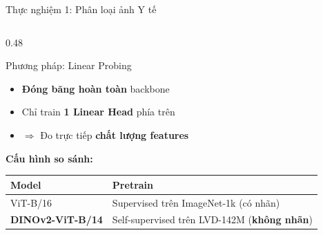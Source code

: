 \documentclass[aspectratio=169]{beamer}
\begin{document}
\begin{frame}[t,shrink=15]{Thực nghiệm 1: Phân loại ảnh Y tế}
\begin{columns}[t]
\begin{column}{0.48\textwidth}
\begin{exampleblock}{Phương pháp: Linear Probing}
                \begin{itemize}
                    \item \textbf{Đóng băng hoàn toàn} backbone
                    \item Chỉ train \textbf{1 Linear Head} phía trên
                    \item $\Rightarrow$ Đo trực tiếp \textbf{chất lượng features}
                \end{itemize}
            \end{exampleblock}
            \vspace{0.15cm}
            \textbf{Cấu hình so sánh:}
            \vspace{0.05cm}
            \small
            \begin{tabular}{|l|p{3.8cm}|}
                \hline
                \rowcolor{uetblue!15}
                \textbf{Model} & \textbf{Pretrain} \\
                \hline
                ViT-B/16 & Supervised trên ImageNet-1k (có nhãn) \\
                \hline
                \rowcolor{uetgold!20}
                \textbf{DINOv2-ViT-B/14} & Self-supervised trên LVD-142M (\textbf{không nhãn}) \\
                \hline
            \end{tabular}
        \end{column}
    \end{columns}
\end{frame}
\end{document}
